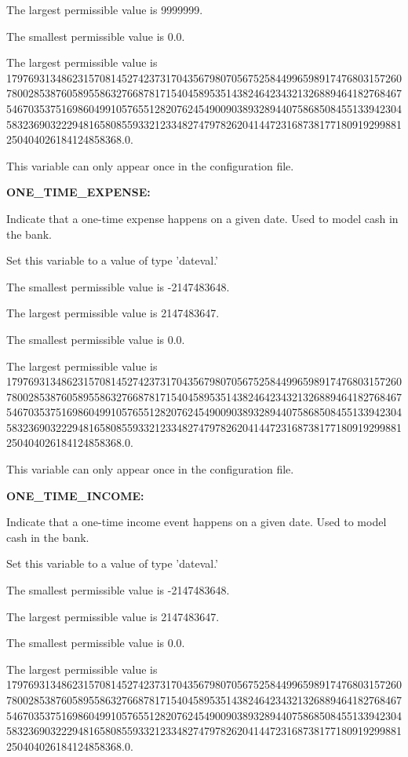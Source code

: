 The largest permissible value is 9999999.

The smallest permissible value is 0.0.

The largest permissible value is 179769313486231570814527423731704356798070567525844996598917476803157260780028538760589558632766878171540458953514382464234321326889464182768467546703537516986049910576551282076245490090389328944075868508455133942304583236903222948165808559332123348274797826204144723168738177180919299881250404026184124858368.0.

This variable can only appear once in the configuration file.


\textbf{ONE\_TIME\_EXPENSE:}


Indicate that a one-time expense happens on a given date.  Used to model cash in the bank.

Set this variable to a value of type 'dateval.'

The smallest permissible value is -2147483648.

The largest permissible value is 2147483647.

The smallest permissible value is 0.0.

The largest permissible value is 179769313486231570814527423731704356798070567525844996598917476803157260780028538760589558632766878171540458953514382464234321326889464182768467546703537516986049910576551282076245490090389328944075868508455133942304583236903222948165808559332123348274797826204144723168738177180919299881250404026184124858368.0.

This variable can only appear once in the configuration file.


\textbf{ONE\_TIME\_INCOME:}


Indicate that a one-time income event happens on a given date.  Used to model cash in the bank.

Set this variable to a value of type 'dateval.'

The smallest permissible value is -2147483648.

The largest permissible value is 2147483647.

The smallest permissible value is 0.0.

The largest permissible value is 179769313486231570814527423731704356798070567525844996598917476803157260780028538760589558632766878171540458953514382464234321326889464182768467546703537516986049910576551282076245490090389328944075868508455133942304583236903222948165808559332123348274797826204144723168738177180919299881250404026184124858368.0.

